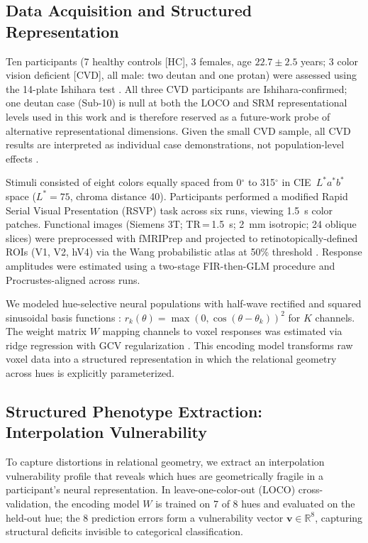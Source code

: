 \documentclass{article}
\begin{document}
\subsection{Data Acquisition and Structured Representation}

Ten participants (7 healthy controls [HC], 3 females, age $22.7 \pm 2.5$ years; 3 color vision deficient [CVD], all male: two deutan and one protan) were assessed using the 14-plate Ishihara test \citep{ishihara1917}.
All three CVD participants are Ishihara-confirmed; one deutan case (Sub-10) is null at both the LOCO and SRM representational levels used in this work and is therefore reserved as a future-work probe of alternative representational dimensions.
Given the small CVD sample, all CVD results are interpreted as individual case demonstrations, not population-level effects \citep{crawford1998}.

Stimuli consisted of eight colors equally spaced from 0$^\circ$ to 315$^\circ$ in CIE~$L^*a^*b^*$ space ($L^* = 75$, chroma distance 40).
Participants performed a modified Rapid Serial Visual Presentation (RSVP) task \citep{brouwer2009} across six runs, viewing 1.5~s color patches.
Functional images (Siemens 3T; TR\,=\,1.5~s; 2~mm isotropic; 24 oblique slices) were preprocessed with fMRIPrep and projected to retinotopically-defined ROIs (V1, V2, hV4) via the Wang probabilistic atlas at 50\% threshold \citep{wang2015}.
Response amplitudes were estimated using a two-stage FIR-then-GLM procedure \citep{brouwer2009} and Procrustes-aligned across runs.

We modeled hue-selective neural populations with half-wave rectified and squared sinusoidal basis functions \citep{brouwer2009}: $r_k(\theta) = \max(0, \cos(\theta - \theta_k))^2$ for $K$ channels.
The weight matrix $W$ mapping channels to voxel responses was estimated via ridge regression with GCV regularization \citep{golub1979}.
This encoding model transforms raw voxel data into a structured representation in which the relational geometry across hues is explicitly parameterized.

\subsection{Structured Phenotype Extraction: Interpolation Vulnerability}

To capture distortions in relational geometry, we extract an interpolation vulnerability profile that reveals which hues are geometrically fragile in a participant's neural representation.
In leave-one-color-out (LOCO) cross-validation, the encoding model $W$ is trained on 7 of 8 hues and evaluated on the held-out hue; the 8 prediction errors form a vulnerability vector $\mathbf{v} \in \mathbb{R}^8$, capturing structural deficits invisible to categorical classification.
\end{document}
